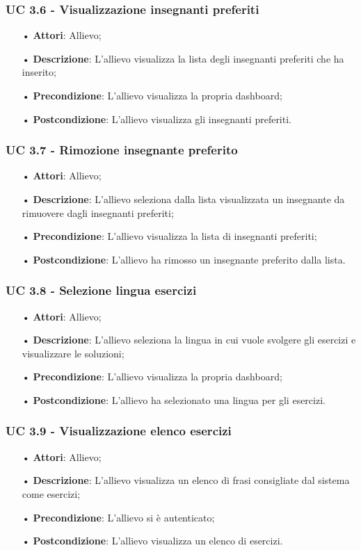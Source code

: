 \subsubsection{UC 3.6 - Visualizzazione insegnanti preferiti}
\begin{itemize}
	\item[•]\textbf{Attori}: Allievo;
	\item[•]\textbf{Descrizione}: L'allievo visualizza la lista degli insegnanti preferiti che ha inserito;
	\item[•]\textbf{Precondizione}: L'allievo visualizza la propria dashboard;
	\item[•]\textbf{Postcondizione}: L'allievo visualizza gli insegnanti preferiti.
\end{itemize}

\subsubsection{UC 3.7 - Rimozione insegnante preferito}
\begin{itemize}
	\item[•]\textbf{Attori}: Allievo;
	\item[•]\textbf{Descrizione}: L'allievo seleziona dalla lista visualizzata un insegnante da rimuovere dagli insegnanti preferiti;
	\item[•]\textbf{Precondizione}: L'allievo visualizza la lista di insegnanti preferiti;
	\item[•]\textbf{Postcondizione}: L'allievo ha rimosso un insegnante preferito dalla lista.
\end{itemize}

\subsubsection{UC 3.8 - Selezione lingua esercizi}
\begin{itemize}
	\item[•]\textbf{Attori}: Allievo;
	\item[•]\textbf{Descrizione}: L'allievo seleziona la lingua in cui vuole svolgere gli esercizi e visualizzare le soluzioni;
	\item[•]\textbf{Precondizione}: L'allievo visualizza la propria dashboard;
	\item[•]\textbf{Postcondizione}: L'allievo ha selezionato una lingua per gli esercizi.
\end{itemize}

\subsubsection{UC 3.9 - Visualizzazione elenco esercizi}
\begin{itemize}
\item[•]\textbf{Attori}: Allievo;
\item[•]\textbf{Descrizione}: L'allievo visualizza un elenco di frasi consigliate dal sistema come esercizi;
\item[•]\textbf{Precondizione}: L'allievo si è autenticato;
\item[•]\textbf{Postcondizione}: L'allievo visualizza un elenco di esercizi.
\end{itemize}

